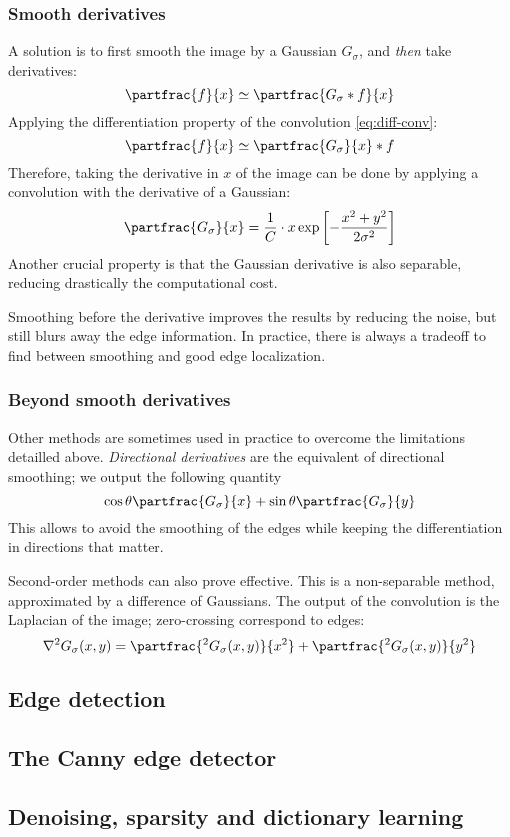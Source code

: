 \subsubsection{Smooth derivatives}
A solution is to first smooth the image by a Gaussian $G_\sigma$, and \emph{then} take derivatives:
\begin{equation*}
    \partfrac{f}{x} \simeq \partfrac{G_\sigma*f}{x}
\end{equation*}
Applying the differentiation property of the convolution \eqref{eq:diff-conv}:
\begin{equation*}
    \partfrac{f}{x} \simeq \partfrac{G_\sigma}{x}*f
\end{equation*}
Therefore, taking the derivative in $x$ of the image can be done by applying a convolution with the derivative of a Gaussian:
\begin{equation*}
    \partfrac{G_\sigma}{x}=\frac{1}{C}\cdot x\exp\left[-\frac{x^2+y^2}{2\sigma^2}\right]
\end{equation*}
Another crucial property is that the Gaussian derivative is also separable, reducing drastically the computational cost.


Smoothing before the derivative improves the results by reducing the noise, but still blurs away the edge information. In practice, there is always a tradeoff to find between smoothing and good edge localization.

\subsubsection{Beyond smooth derivatives}
Other methods are sometimes used in practice to overcome the limitations detailled above. \emph{Directional derivatives} are the equivalent of directional smoothing; we output the following quantity
\begin{equation*}
    \cos\theta\partfrac{G_\sigma}{x}+\sin\theta\partfrac{G_\sigma}{y}
\end{equation*}
This allows to avoid the smoothing of the edges while keeping the differentiation in directions that matter.

Second-order methods can also prove effective. This is a non-separable method, approximated by a difference of Gaussians. The output of the convolution is the Laplacian of the image; zero-crossing correspond to edges:
\begin{equation*}
    \nabla^2G_\sigma(x,y) = \partfrac{^2G_\sigma(x,y)}{x^2} + \partfrac{^2G_\sigma(x,y)}{y^2}
\end{equation*}

\subsection{Edge detection}

\subsection{The Canny edge detector}

\subsection{Denoising, sparsity and dictionary learning}